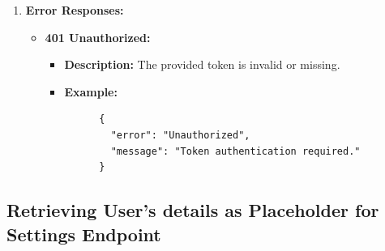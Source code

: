 \documentclass[a4 paper, 12pt]{article}
\begin{document}
\begin{enumerate}
  \item \textbf{Error Responses:}
  \begin{itemize}
    \item \textbf{401 Unauthorized:}
    \begin{itemize}
      \item \textbf{Description:} The provided token is invalid or missing.
      \item \textbf{Example:}
      \begin{verbatim}
      {
        "error": "Unauthorized",
        "message": "Token authentication required."
      }
      \end{verbatim}
    \end{itemize}
  \end{itemize}
\end{enumerate}
\subsection{Retrieving User's details as Placeholder for Settings Endpoint}
\end{document}
